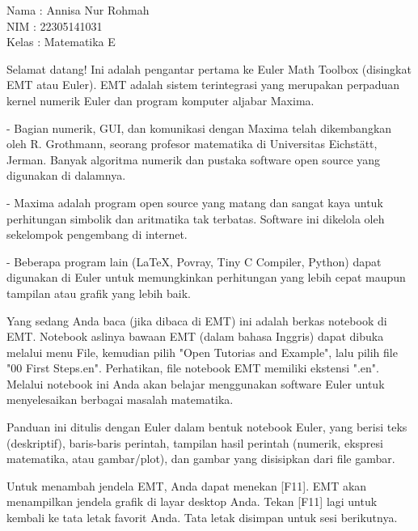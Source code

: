 \documentclass[a4paper,10pt]{article}
\begin{document}
\begin{eulernotebook}
\begin{eulercomment}
Nama    : Annisa Nur Rohmah\\
NIM     : 22305141031\\
Kelas   : Matematika E\\
\end{eulercomment}
\eulersubheading{}
\begin{eulercomment}



\end{eulercomment}
\begin{eulercomment}
Selamat datang! Ini adalah pengantar pertama ke Euler Math Toolbox
(disingkat EMT atau Euler). EMT adalah sistem terintegrasi yang
merupakan perpaduan kernel numerik Euler dan program komputer aljabar
Maxima.

- Bagian numerik, GUI, dan komunikasi dengan Maxima telah dikembangkan
oleh R. Grothmann, seorang profesor matematika di Universitas
Eichstätt, Jerman. Banyak algoritma numerik dan pustaka software open
source yang digunakan di dalamnya.

- Maxima adalah program open source yang matang dan sangat kaya untuk
perhitungan simbolik dan aritmatika tak terbatas. Software ini
dikelola oleh sekelompok pengembang di internet.

- Beberapa program lain (LaTeX, Povray, Tiny C Compiler, Python) dapat
digunakan di Euler untuk memungkinkan perhitungan yang lebih cepat
maupun tampilan atau grafik yang lebih baik.

Yang sedang Anda baca (jika dibaca di EMT) ini adalah berkas notebook
di EMT. Notebook aslinya bawaan EMT (dalam bahasa Inggris) dapat
dibuka melalui menu File, kemudian pilih "Open Tutorias and Example",
lalu pilih file "00 First Steps.en". Perhatikan, file notebook EMT
memiliki ekstensi ".en". Melalui notebook ini Anda akan belajar
menggunakan software Euler untuk menyelesaikan berbagai masalah
matematika.

Panduan ini ditulis dengan Euler dalam bentuk notebook Euler, yang
berisi teks (deskriptif), baris-baris perintah, tampilan hasil
perintah (numerik, ekspresi matematika, atau gambar/plot), dan gambar
yang disisipkan dari file gambar.

Untuk menambah jendela EMT, Anda dapat menekan [F11]. EMT akan
menampilkan jendela grafik di layar desktop Anda. Tekan [F11] lagi
untuk kembali ke tata letak favorit Anda. Tata letak disimpan untuk
sesi berikutnya.


\end{eulercomment}
\end{eulernotebook}
\end{document}
